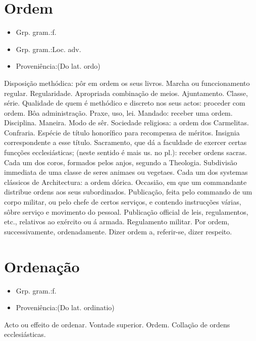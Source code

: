 \section{Ordem}
\begin{itemize}
\item {Grp. gram.:f.}
\end{itemize}
\begin{itemize}
\item {Grp. gram.:Loc. adv.}
\end{itemize}
\begin{itemize}
\item {Proveniência:(Do lat. \textunderscore ordo\textunderscore )}
\end{itemize}
Disposição methódica: \textunderscore pôr em ordem os seus livros\textunderscore .
Marcha ou funccionamento regular.
Regularidade.
Apropriada combinação de meios.
Ajuntamento.
Classe, série.
Qualidade de quem é methódico e discreto nos seus actos: \textunderscore proceder com ordem\textunderscore .
Bôa administração.
Praxe, uso, lei.
Mandado: \textunderscore receber uma ordem\textunderscore .
Disciplina.
Maneira.
Modo de sêr.
Sociedade religiosa: \textunderscore a ordem dos Carmelitas\textunderscore .
Confraria.
Espécie de título honorífico para recompensa de méritos.
Insignia correspondente a esse título.
Sacramento, que dá a faculdade de exercer certas funcções ecclesiásticas; (neste sentido é mais us. no pl.): \textunderscore receber ordens sacras\textunderscore .
Cada um dos coros, formados pelos anjos, segundo a Theologia.
Subdivisão immediata de uma classe de seres animaes ou vegetaes.
Cada um dos systemas clássicos de Architectura: \textunderscore a ordem dórica\textunderscore .
Occasião, em que um commandante distribue ordens aos seus subordinados.
Publicação, feita pelo commando de um corpo militar, ou pelo chefe de certos serviços, e contendo instrucções várias, sôbre serviço e movimento do pessoal.
Publicação official de leis, regulamentos, etc., relativos ao exército ou á armada.
Regulamento militar.
\textunderscore Por ordem\textunderscore , successivamente, ordenadamente.
\textunderscore Dizer ordem a\textunderscore , referir-se, dizer respeito.
\section{Ordenação}
\begin{itemize}
\item {Grp. gram.:f.}
\end{itemize}
\begin{itemize}
\item {Proveniência:(Do lat. \textunderscore ordinatio\textunderscore )}
\end{itemize}
Acto ou effeito de ordenar.
Vontade superior.
Ordem.
Collação de ordens ecclesiásticas.
